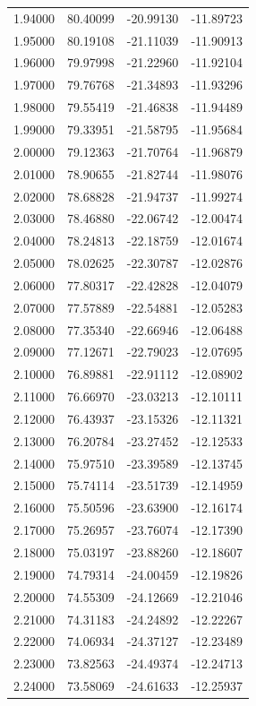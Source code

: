 \begin{table}
\begin{tabular}{llll}
1.94000 & 80.40099 & -20.99130 & -11.89723 \\
1.95000 & 80.19108 & -21.11039 & -11.90913 \\
1.96000 & 79.97998 & -21.22960 & -11.92104 \\
1.97000 & 79.76768 & -21.34893 & -11.93296 \\
1.98000 & 79.55419 & -21.46838 & -11.94489 \\
1.99000 & 79.33951 & -21.58795 & -11.95684 \\
2.00000 & 79.12363 & -21.70764 & -11.96879 \\
2.01000 & 78.90655 & -21.82744 & -11.98076 \\
2.02000 & 78.68828 & -21.94737 & -11.99274 \\
2.03000 & 78.46880 & -22.06742 & -12.00474 \\
2.04000 & 78.24813 & -22.18759 & -12.01674 \\
2.05000 & 78.02625 & -22.30787 & -12.02876 \\
2.06000 & 77.80317 & -22.42828 & -12.04079 \\
2.07000 & 77.57889 & -22.54881 & -12.05283 \\
2.08000 & 77.35340 & -22.66946 & -12.06488 \\
2.09000 & 77.12671 & -22.79023 & -12.07695 \\
2.10000 & 76.89881 & -22.91112 & -12.08902 \\
2.11000 & 76.66970 & -23.03213 & -12.10111 \\
2.12000 & 76.43937 & -23.15326 & -12.11321 \\
2.13000 & 76.20784 & -23.27452 & -12.12533 \\
2.14000 & 75.97510 & -23.39589 & -12.13745 \\
2.15000 & 75.74114 & -23.51739 & -12.14959 \\
2.16000 & 75.50596 & -23.63900 & -12.16174 \\
2.17000 & 75.26957 & -23.76074 & -12.17390 \\
2.18000 & 75.03197 & -23.88260 & -12.18607 \\
2.19000 & 74.79314 & -24.00459 & -12.19826 \\
2.20000 & 74.55309 & -24.12669 & -12.21046 \\
2.21000 & 74.31183 & -24.24892 & -12.22267 \\
2.22000 & 74.06934 & -24.37127 & -12.23489 \\
2.23000 & 73.82563 & -24.49374 & -12.24713 \\
2.24000 & 73.58069 & -24.61633 & -12.25937 \\

\end{tabular}
\end{table}
